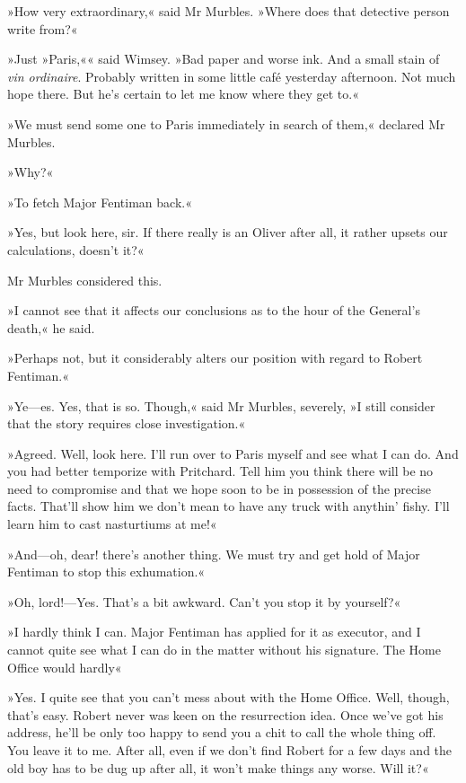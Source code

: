 »How very extraordinary,« said Mr Murbles. »Where does that detective person write from?«

»Just »Paris,«« said Wimsey. »Bad paper and worse ink. And a small stain of \textit{vin ordinaire}. Probably written in some little café yesterday afternoon. Not much hope there. But he's certain to let me know where they get to.«

»We must send some one to Paris immediately in search of them,« declared Mr Murbles.

»Why?«

»To fetch Major Fentiman back.«

»Yes, but look here, sir. If there really is an Oliver after all, it rather upsets our calculations, doesn't it?«

Mr Murbles considered this.

»I cannot see that it affects our conclusions as to the hour of the General's death,« he said.

»Perhaps not, but it considerably alters our position with regard to Robert Fentiman.«

»Ye—es. Yes, that is so. Though,« said Mr Murbles, severely, »I still consider that the story requires close investigation.«

»Agreed. Well, look here. I'll run over to Paris myself and see what I can do. And you had better temporize with Pritchard. Tell him you think there will be no need to compromise and that we hope soon to be in possession of the precise facts. That'll show him we don't mean to have any truck with anythin' fishy. I'll learn him to cast nasturtiums at me!«

»And—oh, dear! there's another thing. We must try and get hold of Major Fentiman to stop this exhumation.«

»Oh, lord!—Yes. That's a bit awkward. Can't you stop it by yourself?«

»I hardly think I can. Major Fentiman has applied for it as executor, and I cannot quite see what I can do in the matter without his signature. The Home Office would hardly\longdash«

»Yes. I quite see that you can't mess about with the Home Office. Well, though, that's easy. Robert never was keen on the resurrection idea. Once we've got his address, he'll be only too happy to send you a chit to call the whole thing off. You leave it to me. After all, even if we don't find Robert for a few days and the old boy has to be dug up after all, it won't make things any worse. Will it?«

